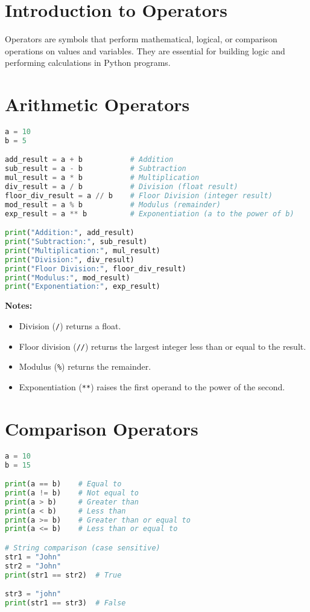 \section{Introduction to Operators}

Operators are symbols that perform mathematical, logical, or comparison operations on values and variables.  
They are essential for building logic and performing calculations in Python programs.

\section{Arithmetic Operators}

\begin{lstlisting}[language=Python]
a = 10
b = 5

add_result = a + b           # Addition
sub_result = a - b           # Subtraction
mul_result = a * b           # Multiplication
div_result = a / b           # Division (float result)
floor_div_result = a // b    # Floor Division (integer result)
mod_result = a % b           # Modulus (remainder)
exp_result = a ** b          # Exponentiation (a to the power of b)

print("Addition:", add_result)
print("Subtraction:", sub_result)
print("Multiplication:", mul_result)
print("Division:", div_result)
print("Floor Division:", floor_div_result)
print("Modulus:", mod_result)
print("Exponentiation:", exp_result)
\end{lstlisting}

\textbf{Notes:}
\begin{itemize}
    \item Division (\texttt{/}) returns a float.
    \item Floor division (\texttt{//}) returns the largest integer less than or equal to the result.
    \item Modulus (\texttt{\%}) returns the remainder.
    \item Exponentiation (\texttt{**}) raises the first operand to the power of the second.
\end{itemize}

\section{Comparison Operators}

\begin{lstlisting}[language=Python]
a = 10
b = 15

print(a == b)    # Equal to
print(a != b)    # Not equal to
print(a > b)     # Greater than
print(a < b)     # Less than
print(a >= b)    # Greater than or equal to
print(a <= b)    # Less than or equal to

# String comparison (case sensitive)
str1 = "John"
str2 = "John"
print(str1 == str2)  # True

str3 = "john"
print(str1 == str3)  # False
\end{lstlisting}

